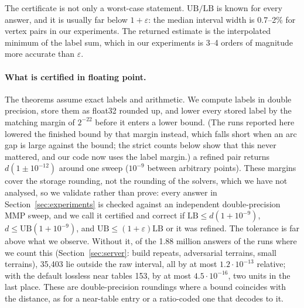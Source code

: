 \documentclass[sigconf,nonacm,screen]{acmart}
\newcommand{\LB}{\mathrm{LB}}
\newcommand{\UB}{\mathrm{UB}}
\newcommand{\eps}{\varepsilon}
\begin{document}
The certificate is not only a worst-case statement. $\UB/\LB$ is known for every answer, and it is usually
far below $1+\eps$: the median interval width is 0.7--2\% for vertex pairs in our experiments. The returned estimate is the
interpolated minimum of the label sum, which in our experiments is 3--4 orders of magnitude more accurate
than $\eps$.

\paragraph{What is certified in floating point.}
The theorems assume exact labels and arithmetic. We compute labels in double precision, store them as float32
rounded up, and lower every stored label by the matching margin of $2^{-22}$ before it enters a lower bound. (The runs
reported here lowered the finished bound by that margin instead, which falls short when an arc gap is large against
the bound; the strict counts below show that this never mattered, and our code now uses the label margin.) a refined pair returns
$d(1\pm10^{-12})$ around one sweep ($10^{-9}$ between arbitrary points). These margins cover the storage rounding,
not the rounding of the solvers, which we have not analysed, so we validate rather than prove: every answer in
Section~\ref{sec:experiments} is checked against an independent double-precision MMP sweep, and we call it
certified and correct if $\LB\le d(1+10^{-9})$, $d\le\UB(1+10^{-9})$, and $\UB\le(1+\eps)\LB$ or it was refined.
The tolerance is far above what we observe. Without it, of the 1.88 million answers of the runs where we count this
(Section~\ref{sec:server}: build repeats, adversarial terrains, small terrains), 35,403 lie outside the raw
interval, all by at most $1.2\cdot10^{-13}$ relative; with the default lossless near tables 153, by at most
$4.5\cdot10^{-16}$, two units in the last place. These are double-precision roundings where a bound coincides with
the distance, as for a near-table entry or a ratio-coded one that decodes to it.
\end{document}
